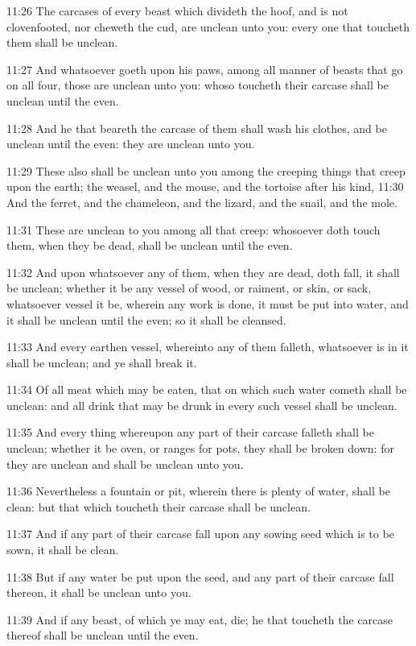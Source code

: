 11:26 The carcases of every beast which divideth the hoof, and is not
clovenfooted, nor cheweth the cud, are unclean unto you: every one
that toucheth them shall be unclean.

11:27 And whatsoever goeth upon his paws, among all manner of beasts
that go on all four, those are unclean unto you: whoso toucheth their
carcase shall be unclean until the even.

11:28 And he that beareth the carcase of them shall wash his clothes,
and be unclean until the even: they are unclean unto you.

11:29 These also shall be unclean unto you among the creeping things
that creep upon the earth; the weasel, and the mouse, and the tortoise
after his kind, 11:30 And the ferret, and the chameleon, and the
lizard, and the snail, and the mole.

11:31 These are unclean to you among all that creep: whosoever doth
touch them, when they be dead, shall be unclean until the even.

11:32 And upon whatsoever any of them, when they are dead, doth fall,
it shall be unclean; whether it be any vessel of wood, or raiment, or
skin, or sack, whatsoever vessel it be, wherein any work is done, it
must be put into water, and it shall be unclean until the even; so it
shall be cleansed.

11:33 And every earthen vessel, whereinto any of them falleth,
whatsoever is in it shall be unclean; and ye shall break it.

11:34 Of all meat which may be eaten, that on which such water cometh
shall be unclean: and all drink that may be drunk in every such vessel
shall be unclean.

11:35 And every thing whereupon any part of their carcase falleth
shall be unclean; whether it be oven, or ranges for pots, they shall
be broken down: for they are unclean and shall be unclean unto you.

11:36 Nevertheless a fountain or pit, wherein there is plenty of
water, shall be clean: but that which toucheth their carcase shall be
unclean.

11:37 And if any part of their carcase fall upon any sowing seed which
is to be sown, it shall be clean.

11:38 But if any water be put upon the seed, and any part of their
carcase fall thereon, it shall be unclean unto you.

11:39 And if any beast, of which ye may eat, die; he that toucheth the
carcase thereof shall be unclean until the even.

